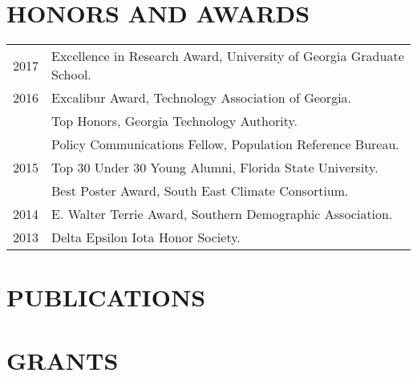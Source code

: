 \documentclass[letterpaper,11pt]{article}
\begin{document}
\section{HONORS AND AWARDS}
\begin{tabular}{ll}
2017 & Excellence in Research Award, University of Georgia Graduate School. \\
2016 & Excalibur Award, Technology Association of Georgia.\\
 & Top Honors, Georgia Technology Authority.\\
 & Policy Communications Fellow, Population Reference Bureau.\\
2015 & Top 30 Under 30 Young Alumni, Florida State University.\\
 & Best Poster Award, South East Climate Consortium.\\
2014 & E. Walter Terrie Award, Southern Demographic Association.\\
2013 & Delta Epsilon Iota Honor Society.\\
\end{tabular}




\section{PUBLICATIONS}



\section{GRANTS}


\end{document}
